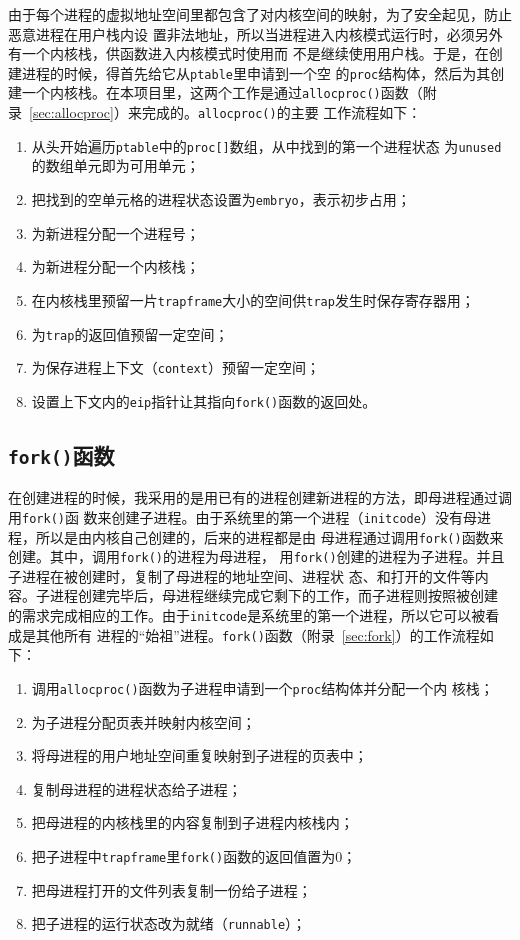 \documentclass{swfuthesism}
\begin{document}
由于每个进程的虚拟地址空间里都包含了对内核空间的映射，为了安全起见，防止恶意进程在用户栈内设
置非法地址，所以当进程进入内核模式运行时，必须另外有一个内核栈，供函数进入内核模式时使用而
不是继续使用用户栈。于是，在创建进程的时候，得首先给它从\texttt{ptable}里申请到一个空
的\texttt{proc}结构体，然后为其创建一个内核栈。在本项目里，这两个工作是通过\texttt{allocproc()}函数（附
录~\ref{sec:allocproc}）来完成的。\texttt{allocproc()}的主要
工作流程如下：
\begin{enumerate}
\item 从头开始遍历\texttt{ptable}中的\texttt{proc[]}数组，从中找到的第一个进程状态
  为\texttt{unused}的数组单元即为可用单元；
\item 把找到的空单元格的进程状态设置为\texttt{embryo}，表示初步占用；
\item 为新进程分配一个进程号；
\item 为新进程分配一个内核栈；
\item 在内核栈里预留一片\texttt{trapframe}大小的空间供\texttt{trap}发生时保存寄存器用；
\item 为\texttt{trap}的返回值预留一定空间；
\item 为保存进程上下文（\texttt{context}）预留一定空间；
\item 设置上下文内的\texttt{eip}指针让其指向\texttt{fork()}函数的返回处。
\end{enumerate}

\subsection{\texttt{fork()}函数}

在创建进程的时候，我采用的是用已有的进程创建新进程的方法，即母进程通过调用\texttt{fork()}函
数来创建子进程。由于系统里的第一个进程（\texttt{initcode}）没有母进程，所以是由内核自己创建的，后来的进程都是由
母进程通过调用\texttt{fork()}函数来创建。其中，调用\texttt{fork()}的进程为母进程，
用\texttt{fork()}创建的进程为子进程。并且子进程在被创建时，复制了母进程的地址空间、进程状
态、和打开的文件等内容。子进程创建完毕后，母进程继续完成它剩下的工作，而子进程则按照被创建
的需求完成相应的工作。由于\texttt{initcode}是系统里的第一个进程，所以它可以被看成是其他所有
进程的``始祖''进程。\texttt{fork()}函数（附录~\ref{sec:fork}）的工作流程如下：
\begin{enumerate}
\item 调用\texttt{allocproc()}函数为子进程申请到一个\texttt{proc}结构体并分配一个内
  核栈；
\item 为子进程分配页表并映射内核空间；
\item 将母进程的用户地址空间重复映射到子进程的页表中；
\item 复制母进程的进程状态给子进程；
\item 把母进程的内核栈里的内容复制到子进程内核栈内；
\item 把子进程中\texttt{trapframe}里\texttt{fork()}函数的返回值置为0；
\item 把母进程打开的文件列表复制一份给子进程；
\item 把子进程的运行状态改为就绪（\texttt{runnable}）；
\end{enumerate}
\end{document}
